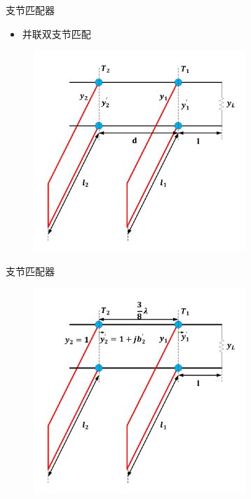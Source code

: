 \begin{frame}{支节匹配器}
  \begin{itemize}
    \item 并联双支节匹配
  \end{itemize}
  \centering
  \begin{figure}
    \includegraphics[width=8cm]{fig4-36.pdf}
  \end{figure}
\end{frame}

\begin{frame}{支节匹配器}
  
  \centering
  \begin{figure}
    \includegraphics[width=8cm]{fig4-37.pdf}
  \end{figure}
\end{frame}

